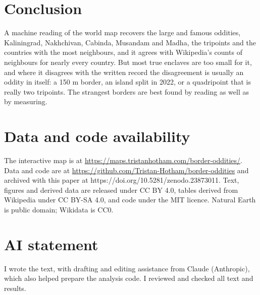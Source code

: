 \documentclass[11pt,a4paper]{article}
\begin{document}
\section{Conclusion}
A machine reading of the world map recovers the large and famous oddities, Kaliningrad, Nakhchivan, Cabinda, Musandam and Madha, the tripoints and the countries with the most neighbours, and it agrees with Wikipedia's counts of neighbours for nearly every country. But most true enclaves are too small for it, and where it disagrees with the written record the disagreement is usually an oddity in itself: a 150 m border, an island split in 2022, or a quadripoint that is really two tripoints. The strangest borders are best found by reading as well as by measuring.

\section*{Data and code availability}
The interactive map is at \url{https://maps.tristanhotham.com/border-oddities/}. Data and code are at \url{https://github.com/Tristan-Hotham/border-oddities} and archived with this paper at https://doi.org/10.5281/zenodo.23873011. Text, figures and derived data are released under CC BY 4.0, tables derived from Wikipedia under CC BY-SA 4.0, and code under the MIT licence. Natural Earth is public domain; Wikidata is CC0.

\section*{AI statement}
I wrote the text, with drafting and editing assistance from Claude (Anthropic), which also helped prepare the analysis code. I reviewed and checked all text and results.
\end{document}
